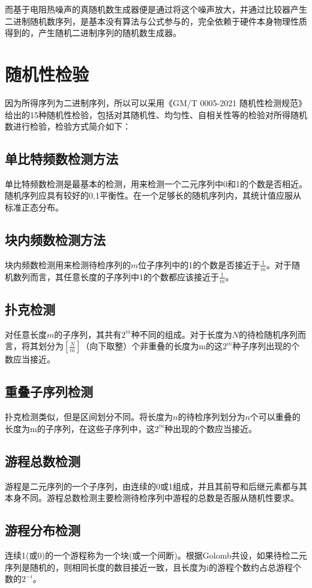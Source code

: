 \documentclass[12pt,a4paper]{article}%
\begin{document}
    而基于电阻热噪声的真随机数生成器便是通过将这个噪声放大，并通过比较器产生二进制随机数序列，是基本没有算法与公式参与的，完全依赖于硬件本身物理性质得到的，产生随机二进制序列的随机数生成器。


    \section{随机性检验}
    因为所得序列为二进制序列，所以可以采用《GM/T 0005-2021 随机性检测规范》给出的15种随机性检验，包括对其随机性、均匀性、自相关性等的检验对所得随机数进行检验，检验方式简介如下：

    \subsection{单比特频数检测方法}
    单比特频数检测是最基本的检测，用来检测一个二元序列中0和1的个数是否相近。随机序列应具有较好的0,1平衡性。在一个足够长的随机序列内，其统计值应服从标准正态分布。

    \subsection{块内频数检测方法}
    块内频数检测用来检测待检序列的$m$位子序列中的1的个数是否接近于$\frac{1}{m}$。对于随机数列而言，其任意长度的子序列中1的个数都应该接近于$\frac{1}{m}$。

    \subsection{扑克检测}
    对任意长度$m$的子序列，其共有$2^m$种不同的组成。对于长度为$N$的待检随机序列而言，将其划分为$[\frac{N}{m}]$（向下取整）个非重叠的长度为m的这$2^m$种子序列出现的个数应当接近。

    \subsection{{重叠子序列检测}}
    扑克检测类似，但是区间划分不同。将长度为$n$的待检序列划分为$n$个可以重叠的长度为m的子序列，在这些子序列中，这$2^m$种出现的个数应当接近。

    \subsection{游程总数检测}
    游程是二元序列的一个子序列，由连续的0或1组成，并且其前导和后继元素都与其本身不同。游程总数检测主要检测待检序列中游程的总数是否服从随机性要求。

    \subsection{游程分布检测}
    连续1(或0)的一个游程称为一个块(或一个间断)。根据Golomb共设，如果待检二元序列是随机的，则相同长度的数目接近一致，且长度为i的游程个数约占总游程个数的$2^{-i}$。
\end{document}
